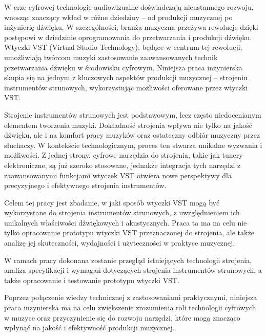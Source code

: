 \begin{spacing}{1.5} %

    W erze cyfrowej technologie audiowizualne doświadczają nieustannego rozwoju, wnosząc znaczący wkład w różne dziedziny – od produkcji muzycznej po inżynierię dźwięku. W szczególności, branża muzyczna przeżywa rewolucję dzięki postępowi w dziedzinie oprogramowania do przetwarzania i produkcji dźwięku. Wtyczki VST (Virtual Studio Technology), będące w centrum tej rewolucji, umożliwiają twórcom muzyki zastosowanie zaawansowanych technik przetwarzania dźwięku w środowisku cyfrowym. Niniejsza praca inżynierska skupia się na jednym z kluczowych aspektów produkcji muzycznej – strojeniu instrumentów strunowych, wykorzystując możliwości oferowane przez wtyczki VST. 

    Strojenie instrumentów strunowych jest podstawowym, lecz często niedocenianym elementem tworzenia muzyki. Dokładność strojenia wpływa nie tylko na jakość dźwięku, ale i na komfort pracy muzyków oraz ostateczny odbiór muzyczny przez słuchaczy. W kontekście technologicznym, proces ten stwarza unikalne wyzwania i możliwości. Z jednej strony, cyfrowe narzędzia do strojenia, takie jak tunery elektroniczne, są już szeroko stosowane, jednakże integracja tych narzędzi z zaawansowanymi funkcjami wtyczek VST otwiera nowe perspektywy dla precyzyjnego i efektywnego strojenia instrumentów. 

    Celem tej pracy jest zbadanie, w jaki sposób wtyczki VST mogą być wykorzystane do strojenia instrumentów strunowych, z uwzględnieniem ich unikalnych właściwości dźwiękowych i akustycznych. Praca ta ma na celu nie tylko opracowanie prototypu wtyczki VST przeznaczonej do strojenia, ale także analizę jej skuteczności, wydajności i użyteczności w praktyce muzycznej. 

    W ramach pracy dokonana zostanie przegląd istniejących technologii strojenia, analiza specyfikacji i wymagań dotyczących strojenia instrumentów strunowych, a także opracowanie i testowanie prototypu wtyczki VST. 

    Poprzez połączenie wiedzy technicznej z zastosowaniami praktycznymi, niniejsza praca inżynierska ma na celu zwiększenie zrozumienia roli technologii cyfrowych w muzyce oraz przyczynienie się do rozwoju narzędzi, które mogą znacząco wpłynąć na jakość i efektywność produkcji muzycznej.

\end{spacing} %